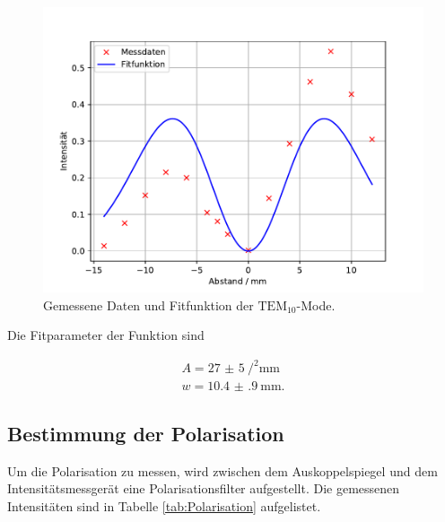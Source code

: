 \FloatBarrier
\begin{figure}
  \centering
  \includegraphics[width = \textwidth, keepaspectratio]{figure/TEM01_new.pdf}
  \caption{Gemessene Daten und Fitfunktion der $\text{TEM}_{10}$-Mode.}
\end{figure}
\FloatBarrier

Die Fitparameter der Funktion sind 

\begin{align*}
  A=\SI{27(5)}{\square\per\milli\meter}\\
  w=\SI{10.4(9)}{\milli\meter}.
\end{align*}

\subsection{Bestimmung der Polarisation}

Um die Polarisation zu messen, wird zwischen dem Auskoppelspiegel und dem Intensitätsmessgerät eine Polarisationsfilter 
aufgestellt. Die gemessenen Intensitäten sind in Tabelle \ref{tab:Polarisation} aufgelistet.

